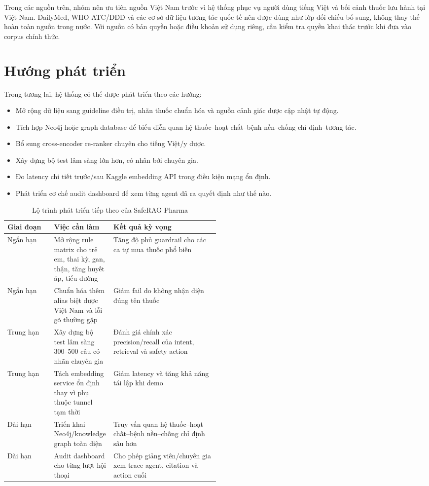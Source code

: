 Trong các nguồn trên, nhóm nên ưu tiên nguồn Việt Nam trước vì hệ thống phục vụ người dùng tiếng Việt và bối cảnh thuốc lưu hành tại Việt Nam. DailyMed, WHO ATC/DDD và các cơ sở dữ liệu tương tác quốc tế nên được dùng như lớp đối chiếu bổ sung, không thay thế hoàn toàn nguồn trong nước. Với nguồn có bản quyền hoặc điều khoản sử dụng riêng, cần kiểm tra quyền khai thác trước khi đưa vào corpus chính thức.

\section{Hướng phát triển}

Trong tương lai, hệ thống có thể được phát triển theo các hướng:

\begin{itemize}
  \item Mở rộng dữ liệu sang guideline điều trị, nhãn thuốc chuẩn hóa và nguồn cảnh giác dược cập nhật tự động.
  \item Tích hợp Neo4j hoặc graph database để biểu diễn quan hệ thuốc--hoạt chất--bệnh nền--chống chỉ định--tương tác.
  \item Bổ sung cross-encoder re-ranker chuyên cho tiếng Việt/y dược.
  \item Xây dựng bộ test lâm sàng lớn hơn, có nhãn bởi chuyên gia.
  \item Đo latency chi tiết trước/sau Kaggle embedding API trong điều kiện mạng ổn định.
  \item Phát triển cơ chế audit dashboard để xem từng agent đã ra quyết định như thế nào.
\end{itemize}

\begin{table}[H]
\centering
\small
\caption{Lộ trình phát triển tiếp theo của SafeRAG Pharma}
\begin{tabularx}{\linewidth}{p{0.22\linewidth} p{0.28\linewidth} Y}
\toprule
\textbf{Giai đoạn} & \textbf{Việc cần làm} & \textbf{Kết quả kỳ vọng} \\
\midrule
Ngắn hạn & Mở rộng rule matrix cho trẻ em, thai kỳ, gan, thận, tăng huyết áp, tiểu đường & Tăng độ phủ guardrail cho các ca tự mua thuốc phổ biến \\
Ngắn hạn & Chuẩn hóa thêm alias biệt dược Việt Nam và lỗi gõ thường gặp & Giảm fail do không nhận diện đúng tên thuốc \\
Trung hạn & Xây dựng bộ test lâm sàng 300--500 câu có nhãn chuyên gia & Đánh giá chính xác precision/recall của intent, retrieval và safety action \\
Trung hạn & Tách embedding service ổn định thay vì phụ thuộc tunnel tạm thời & Giảm latency và tăng khả năng tái lập khi demo \\
Dài hạn & Triển khai Neo4j/knowledge graph toàn diện & Truy vấn quan hệ thuốc--hoạt chất--bệnh nền--chống chỉ định sâu hơn \\
Dài hạn & Audit dashboard cho từng lượt hội thoại & Cho phép giảng viên/chuyên gia xem trace agent, citation và action cuối \\
\bottomrule
\end{tabularx}
\end{table}

